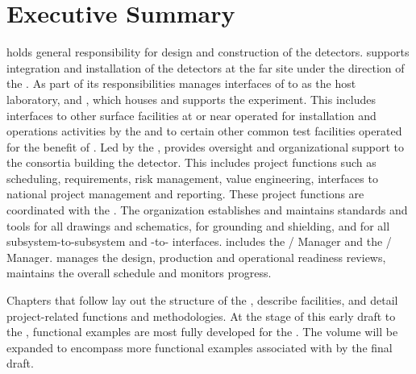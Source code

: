 \chapter{Executive Summary}
\label{vl:tc-execsum}


  holds general responsibility for design and
construction of the  detectors.  supports
integration and installation of the detectors at the far site under
the direction of the .  As part of its responsibilities
 manages interfaces of  to  as the host
laboratory,  and , which houses and supports
the  experiment. This includes interfaces to other surface
facilities at or near  operated for installation and
operations activities by the  and to certain other common test
facilities operated for the benefit of . Led by the
 ,   provides
oversight and organizational support to the consortia building the
 detector.  This includes project functions such as
scheduling, requirements, risk management, value engineering,
interfaces to national project management and reporting. These project
functions are coordinated with the .  The 
organization establishes and maintains standards and tools for all
drawings and schematics, for grounding and shielding, and for all 
subsystem-to-subsystem and -to- interfaces.
 includes the /  Manager
and the /  Manager. 
 manages the design, production and operational readiness
reviews, maintains the overall schedule and monitors progress.

Chapters that follow lay out the structure of the  ,
describe  facilities, and detail project-related functions
and methodologies. At the stage of this early draft to the  ,
  functional examples are most fully developed
for the  . The volume will be expanded to
encompass more functional examples associated with 
 by the final draft.

